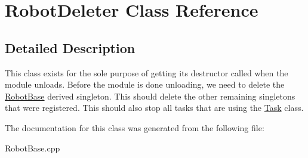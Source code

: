\hypertarget{classRobotDeleter}{
\section{RobotDeleter Class Reference}
\label{classRobotDeleter}
}


\subsection{Detailed Description}
This class exists for the sole purpose of getting its destructor called when the module unloads. Before the module is done unloading, we need to delete the \hyperlink{classRobotBase}{RobotBase} derived singleton. This should delete the other remaining singletons that were registered. This should also stop all tasks that are using the \hyperlink{classTask}{Task} class. 

The documentation for this class was generated from the following file:\begin{DoxyCompactItemize}
\item 
RobotBase.cpp\end{DoxyCompactItemize}
